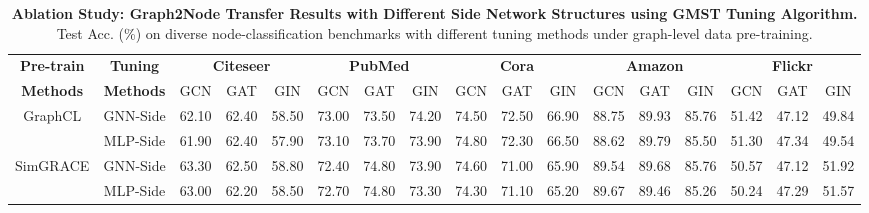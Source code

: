 \begin{table*}[h]
    \vspace{-5mm}
  \caption{\textbf{Ablation Study: Graph2Node Transfer Results with Different Side Network Structures using GMST Tuning Algorithm.} Test Acc. (\%) on diverse node-classification benchmarks with different tuning methods under graph-level data pre-training.}
  \begin{center}
  \fontsize{7.5}{8.5}\selectfont
  \setlength\tabcolsep{1.5 pt}
  {\renewcommand{\arraystretch}{1.5}
\begin{tabular}{cc|ccc|ccc|ccc|ccc|ccc}
\hline
\hline
\multicolumn{1}{c|}{\multirow{1}{*}{\textbf{Pre-train}}} & \multirow{1}{*}{\textbf{Tuning }} & \multicolumn{3}{c|}{\textbf{Citeseer}} & \multicolumn{3}{c|}{\textbf{PubMed}} & \multicolumn{3}{c|}{\textbf{Cora}} & \multicolumn{3}{c|}{\textbf{Amazon}} & \multicolumn{3}{c}{\textbf{Flickr}}\\
\multicolumn{1}{c|}{\textbf{Methods}} & \textbf{Methods} & GCN & GAT & GIN & GCN & GAT & GIN & GCN & GAT & GIN & GCN & GAT & GIN  & GCN & GAT &GIN  \\ \hline
\multicolumn{1}{c|}{\multirow{2}{*}{GraphCL}} & GNN-Side & 62.10& 62.40 & 58.50& 73.00& 73.50& 74.20& 74.50& 72.50& 66.90& 88.75& 89.93& 85.76& 51.42& 47.12&49.84\\
\multicolumn{1}{c|}{} & MLP-Side & 61.90 & 62.40 & 57.90 & 73.10 & 73.70 & 73.90 & 74.80 & 72.30 & 66.50 & 88.62 & 89.79 & 85.50  & 51.30& 47.34&49.54\\ \hline
\multicolumn{1}{c|}{\multirow{2}{*}{SimGRACE}} & GNN-Side & 63.30& 62.50& 58.80& 72.40& 74.80& 73.90& 74.60& 71.00& 65.90& 89.54& 89.68&  85.76& 50.57& 47.12&51.92\\
\multicolumn{1}{c|}{} & MLP-Side & 63.00  & 62.20 & 58.50 & 72.70 & 74.80 & 73.30 & 74.30 & 71.10 & 65.20 & 89.67 &  89.46  & 85.26   & 50.24& 47.29&51.57\\
\hline
\hline
\end{tabular}}
  \end{center}
  \label{hard_sidenet}
  \vspace{-3mm}
  \end{table*}